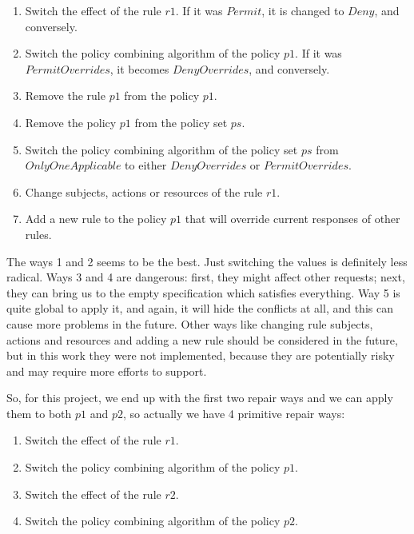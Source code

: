 \documentclass[letterpaper]{acm_proc_article-sp}
\begin{document}
\begin{enumerate}
\item Switch the effect of the rule $r1$. If it was $Permit$, it is changed to $Deny$, and conversely.
\item Switch the policy combining algorithm of the policy $p1$. If it was $PermitOverrides$, it becomes $DenyOverrides$, and conversely.
\item Remove the rule $p1$ from the policy $p1$.
\item Remove the policy $p1$ from the policy set $ps$.
\item Switch the policy combining algorithm of the policy set $ps$ from $OnlyOneApplicable$ to either $DenyOverrides$ or $PermitOverrides$.
\item Change subjects, actions or resources of the rule $r1$.
\item Add a new rule to the policy $p1$ that will override current responses of other rules.
\end{enumerate}

The ways 1 and 2 seems to be the best. Just switching the values is definitely less radical. Ways 3 and 4 are dangerous: first, they might affect other requests; next, they can bring us to the empty specification which satisfies everything. Way 5 is quite global to apply it, and again, it will hide the conflicts at all, and this can cause more problems in the future. Other ways like changing rule subjects, actions and resources and adding a new rule should be considered in the future, but in this work they were not implemented, because they are potentially risky and may require more efforts to support. 

So, for this project, we end up with the first two repair ways and we can apply them to both $p1$ and $p2$, so actually we have 4 primitive repair ways:

\begin{enumerate}
\item Switch the effect of the rule $r1$.
\item Switch the policy combining algorithm of the policy $p1$.
\item Switch the effect of the rule $r2$.
\item Switch the policy combining algorithm of the policy $p2$.
\end{enumerate}
\end{document}
